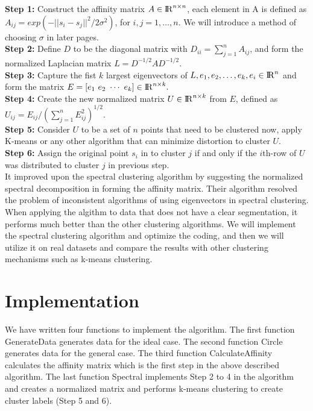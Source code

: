 \documentclass[11pt]{article}
\begin{document}
\textbf{Step 1:} Construct the affinity matrix $A \in{\rm I\!R}^{n\times n} $,  each element in A is defined as $A_{ij} = exp(-||s_i-s_j||^2/2\sigma^2)$,  for $i, j = 1,\ldots, n$. We will introduce a method of choosing $\sigma$ in later pages.\\

\textbf{Step 2:} Define $D$ to be the diagonal matrix with $D_{ii} =\sum_{j=1}^{n} A _{ij}$, and form the normalized Laplacian matrix $L = D^{-1/2}AD^{-1/2}$.\\

\textbf{Step 3:} Capture the fist $k$ largest eigenvectors of $L, e_1, e_2,  \ldots, e_k, e_i \in {\rm I\!R}^{n} $ and form the matrix $E = [e_1 ~e_2 ~\cdots ~e_k ] \in  {\rm I\!R}^{n\times k}.$\\

\textbf{Step 4:} Create the new normalized matrix $U \in {\rm I\!R}^{n\times k}$ from $E$, defined as $U_{ij}= E_{ij}/(\sum_{j=1}^{n}E_{ij}^2)^{1/2}$. \\

\textbf{Step 5:} Consider $U$ to be a set of $n$   points that need to be clustered now, apply K-means or any other algorithm that can minimize distortion to cluster $U$. \\

\textbf{Step 6:}  Assign the original point $s_i$ in to cluster $j$ if and only if the $i$th-row of $U$ was distributed to cluster $j$  in previous step.       \\

It improved upon the spectral clustering algorithm by suggesting the normalized spectral decomposition in forming the affinity matrix. Their algorithm resolved the problem of inconsistent algorithms of using eigenvectors in spectral clustering. When applying the algithm to data that does not have a clear segmentation, it performs much better than the other clustering algorithms. We will implement the spectral clustering algorithm and optimize the coding, and then we will utilize it on real datasets and compare the results with other clustering mechanisms such as k-means clustering.



\section{Implementation}
We have written four functions to implement the algorithm. The first function GenerateData generates data for the ideal case. The second function Circle generates data for the general case. The third function CalculateAffinity calculates the affinity matrix which is the first step in the above described algorithm. The last function Spectral implements Step 2 to 4 in the algorithm and creates a normalized matrix and performs k-means clustering to create cluster labels (Step 5 and 6).
\end{document}
